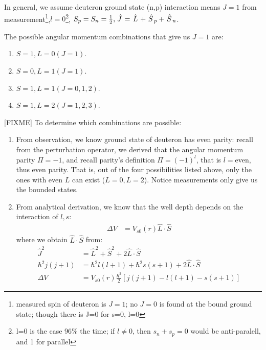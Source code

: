 \documentclass{school-22.101-notes}
\begin{document}
In general, we assume deuteron ground state (n,p) interaction means $J=1$ from measurement\footnote{measured spin of deuteron is $J=1$; no $J=0$ is found at the bound ground state; though there is J=0 for s=0, l=0},$l=0$\footnote{l=0 is the case 96\% the time; if $l\neq 0$, then $s_n+s_p =0$ would be anti-paralell, and 1 for parallel}, $S_p = S_n = \frac{1}{2}, \left. \hat{J} \right. = \left. \hat{L} \right. + \left. \hat{S} \right._p + \left. \hat{S} \right._n$. 

The possible angular momentum combinations that give us $J=1$ are: 
\begin{enumerate}
\item $S=1, L=0 (J=1) $.
\item $S=0, L=1 (J=1)$. 
\item $S=1, L=1 (J=0,1,2)$. 
\item $S=1, L=2 (J = 1,2,3)$.
\end{enumerate}

[FIXME] To determine which combinations are possible:
\begin{enumerate}
\item From observation, we know ground state of deuteron has even parity: recall from the perturbation operator, we derived that the angular momentum parity $\Pi = -1$,  and recall parity's definition $\Pi = (-1)^l$, that is $l = $even, thus even parity. That is, out of the four possibilities listed above, only the ones with even $L$ can exist ($L=0, L=2$). Notice measurements only give us the bounded states.  

\item From analytical derivation, we know that the well depth depends on the interaction of $l, s$: 
  \begin{align}
  \Delta V &= V_{s0} (r) \hat{L} \cdot \hat{S}
  \end{align}
  where we obtain $\hat{L} \cdot \hat{S}$ from: 
  \begin{align}
    \hat{J}^2 &= \hat{L}^2 + \hat{S}^2 + 2  \hat{L} \cdot \hat{S} \\
    \hbar^2 j(j+1) &= \hbar^2 l(l+1) + \hbar^2 s(s+1) + 2 \hat{L} \cdot \hat{S} \\
    \Delta V &= V_{s0} (r) \frac{\hbar^2}{2} \left[ j(j+1) - l(l+1) - s(s+1) \right] 
  \end{align}
\end{enumerate}
\end{document}
